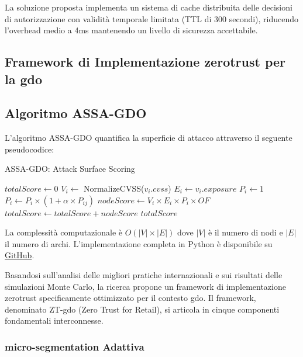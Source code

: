 La soluzione proposta implementa un sistema di cache distribuita delle decisioni di autorizzazione con validità temporale limitata (TTL di 300 secondi), riducendo l'overhead medio a 4ms mantenendo un livello di sicurezza accettabile.


\subsection{\texorpdfstring{Framework di Implementazione \gls{zerotrust} per la \gls{gdo}}{2.4.2 - Framework di Implementazione Zero Trust per la GDO}}

\subsection{\texorpdfstring{Algoritmo ASSA-GDO}{2.4.2 - Algoritmo ASSA-GDO}}

L'algoritmo ASSA-GDO quantifica la superficie di attacco attraverso 
il seguente pseudocodice:

\begin{algorithm}
\caption{ASSA-GDO: Attack Surface Scoring}
\begin{algorithmic}[1]
    \State $totalScore \gets 0$
        \State $V_i \gets$ NormalizeCVSS($v_i.cvss$)
        \State $E_i \gets v_i.exposure$
        \State $P_i \gets 1$
            \State $P_i \gets P_i \times (1 + \alpha \times P_{ij})$
        \EndFor
        \State $nodeScore \gets V_i \times E_i \times P_i \times OF$
        \State $totalScore \gets totalScore + nodeScore$
    \EndFor
    \State \Return $totalScore$
\EndProcedure
\end{algorithmic}
\end{algorithm}

La complessità computazionale è $O(|V| \times |E|)$ dove $|V|$ è il 
numero di nodi e $|E|$ il numero di archi. L'implementazione completa 
in Python è disponibile su \href{https://github.com/[tuo-username]/gist-framework-gdo}{GitHub}.

Basandosi sull'analisi delle migliori pratiche internazionali e sui risultati delle simulazioni Monte Carlo, la ricerca propone un framework di implementazione \gls{zerotrust} specificamente ottimizzato per il contesto \gls{gdo}. Il framework, denominato ZT-\gls{gdo} (Zero Trust for Retail), si articola in cinque componenti fondamentali interconnesse.

\subsubsection{\texorpdfstring{\gls{micro-segmentation} Adattiva}{2.4.2.1 - Micro-segmentazione Adattiva}}

